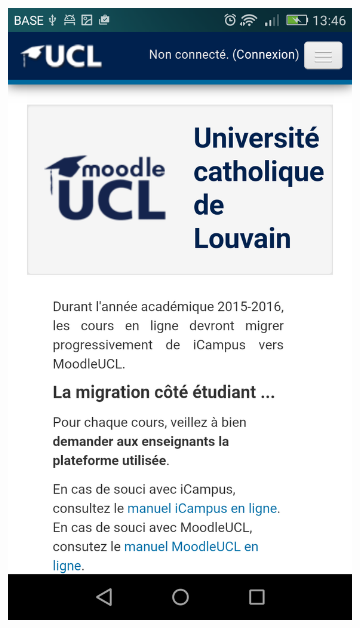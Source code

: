 \documentclass{eplmastersthesis}
\begin{document}
\begin{figure}
\begin{subfigure}[b]{0.3\textwidth}
        \includegraphics[width=\textwidth]{Images/Application_screens/Screenshot_2016-06-06-13-46-46.png}
    \end{subfigure}
    ~ %
    \begin{subfigure}[b]{0.3\textwidth}

\end{subfigure}
\end{figure}
\end{document}
